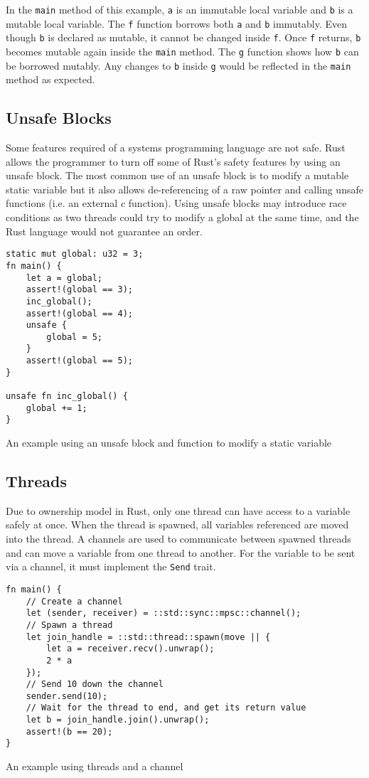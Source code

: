 In the \texttt{main} method of this example, \texttt{a} is an immutable local variable and \texttt{b} is a mutable local variable. The \texttt{f} function borrows both \texttt{a} and \texttt{b} immutably. Even though \texttt{b} is declared as mutable, it cannot be changed inside \texttt{f}. Once \texttt{f} returns, \texttt{b} becomes mutable again inside the \texttt{main} method. The \texttt{g} function shows how \texttt{b} can be borrowed mutably. Any changes to \texttt{b} inside \texttt{g} would be reflected in the \texttt{main} method as expected.

\subsection{Unsafe Blocks}
Some features required of a systems programming language are not safe. Rust allows the programmer to turn off some of Rust's safety features by using an unsafe block. The most common use of an unsafe block is to modify a mutable static variable but it also allows de-referencing of a raw pointer and calling unsafe functions (i.e. an external c function). Using unsafe blocks may introduce race conditions as two threads could try to modify a global at the same time, and the Rust language would not guarantee an order.

\begin{code}
\begin{verbatim}
static mut global: u32 = 3;
fn main() {
    let a = global;
    assert!(global == 3);
    inc_global();
    assert!(global == 4);
    unsafe {
        global = 5;
    }
    assert!(global == 5);
}

unsafe fn inc_global() {
    global += 1;
}
\end{verbatim}
\caption{An example using an unsafe block and function to modify a static variable}
\end{code}

\subsection{Threads}
Due to ownership model in Rust, only one thread can have access to a variable safely at once. When the thread is spawned, all variables referenced are moved into the thread. A channels are used to communicate between spawned threads and can move a variable from one thread to another. For the variable to be sent via a channel, it must implement the \texttt{Send} trait.

\begin{code}
\begin{verbatim}
fn main() {
    // Create a channel
    let (sender, receiver) = ::std::sync::mpsc::channel();
    // Spawn a thread
    let join_handle = ::std::thread::spawn(move || {
        let a = receiver.recv().unwrap();
        2 * a
    });
    // Send 10 down the channel
    sender.send(10);
    // Wait for the thread to end, and get its return value
    let b = join_handle.join().unwrap();
    assert!(b == 20);
}
\end{verbatim}
\caption{An example using threads and a channel}
\end{code}

